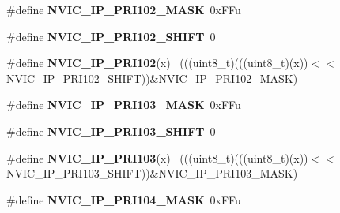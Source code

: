 \begin{DoxyCompactItemize}
\item 
\hypertarget{group___n_v_i_c___register___masks_ga5221b7d988cace30c0da88d58ea6c738}{}\#define {\bfseries N\+V\+I\+C\+\_\+\+I\+P\+\_\+\+P\+R\+I102\+\_\+\+M\+A\+S\+K}~0x\+F\+Fu\label{group___n_v_i_c___register___masks_ga5221b7d988cace30c0da88d58ea6c738}

\item 
\hypertarget{group___n_v_i_c___register___masks_gaeea790f40edd4fbd14e5533c0e8dcd30}{}\#define {\bfseries N\+V\+I\+C\+\_\+\+I\+P\+\_\+\+P\+R\+I102\+\_\+\+S\+H\+I\+F\+T}~0\label{group___n_v_i_c___register___masks_gaeea790f40edd4fbd14e5533c0e8dcd30}

\item 
\hypertarget{group___n_v_i_c___register___masks_ga3c4f6e4eae4d3e1c15e47f0594c573e8}{}\#define {\bfseries N\+V\+I\+C\+\_\+\+I\+P\+\_\+\+P\+R\+I102}(x)                                            ~(((uint8\+\_\+t)(((uint8\+\_\+t)(x))$<$$<$N\+V\+I\+C\+\_\+\+I\+P\+\_\+\+P\+R\+I102\+\_\+\+S\+H\+I\+F\+T))\&N\+V\+I\+C\+\_\+\+I\+P\+\_\+\+P\+R\+I102\+\_\+\+M\+A\+S\+K)\label{group___n_v_i_c___register___masks_ga3c4f6e4eae4d3e1c15e47f0594c573e8}

\item 
\hypertarget{group___n_v_i_c___register___masks_gac362f930a0c9309e11ba201540eb4812}{}\#define {\bfseries N\+V\+I\+C\+\_\+\+I\+P\+\_\+\+P\+R\+I103\+\_\+\+M\+A\+S\+K}~0x\+F\+Fu\label{group___n_v_i_c___register___masks_gac362f930a0c9309e11ba201540eb4812}

\item 
\hypertarget{group___n_v_i_c___register___masks_gab66036e691b7d0ed17e46f3c81d8b776}{}\#define {\bfseries N\+V\+I\+C\+\_\+\+I\+P\+\_\+\+P\+R\+I103\+\_\+\+S\+H\+I\+F\+T}~0\label{group___n_v_i_c___register___masks_gab66036e691b7d0ed17e46f3c81d8b776}

\item 
\hypertarget{group___n_v_i_c___register___masks_gafd4c39af3fb9acacb5e79679255be89f}{}\#define {\bfseries N\+V\+I\+C\+\_\+\+I\+P\+\_\+\+P\+R\+I103}(x)                                            ~(((uint8\+\_\+t)(((uint8\+\_\+t)(x))$<$$<$N\+V\+I\+C\+\_\+\+I\+P\+\_\+\+P\+R\+I103\+\_\+\+S\+H\+I\+F\+T))\&N\+V\+I\+C\+\_\+\+I\+P\+\_\+\+P\+R\+I103\+\_\+\+M\+A\+S\+K)\label{group___n_v_i_c___register___masks_gafd4c39af3fb9acacb5e79679255be89f}

\item 
\hypertarget{group___n_v_i_c___register___masks_ga3a2c26c150b6beddeebeaf10ad2e34c4}{}\#define {\bfseries N\+V\+I\+C\+\_\+\+I\+P\+\_\+\+P\+R\+I104\+\_\+\+M\+A\+S\+K}~0x\+F\+Fu\label{group___n_v_i_c___register___masks_ga3a2c26c150b6beddeebeaf10ad2e34c4}


\end{DoxyCompactItemize}
